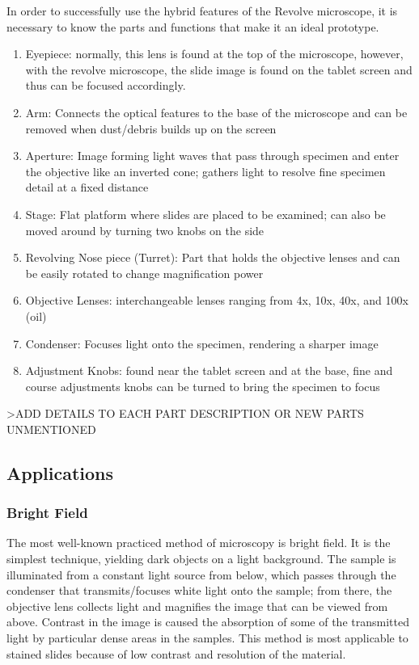 \documentclass{article}
\begin{document}
In order to successfully use the hybrid features of the Revolve microscope, it is necessary to know the parts and functions that make it an ideal prototype. 
  \begin{enumerate}
  \item Eyepiece: normally, this lens is found  at the top of the microscope, however, with the revolve microscope, the slide image is found on the tablet screen and thus can be focused accordingly.
  \item Arm: Connects the optical features to the base of the microscope and can be removed when dust/debris builds up on the screen 
  \item Aperture: Image forming light waves that pass through specimen and enter the objective like an inverted cone; gathers light to resolve fine specimen detail at a fixed distance
  \item Stage: Flat platform where slides are placed to be examined; can also be moved around by turning two knobs on the side 
  \item Revolving Nose piece (Turret): Part that holds the objective lenses and can be easily rotated to change magnification power
  \item Objective Lenses: interchangeable lenses ranging from 4x, 10x, 40x, and 100x (oil)
  \item Condenser: Focuses light onto the specimen, rendering a sharper image
  \item Adjustment Knobs: found near the tablet screen and at the base, fine and course adjustments knobs can be turned to bring the specimen to focus 
\end{enumerate}
 
 >ADD DETAILS TO EACH PART DESCRIPTION OR NEW PARTS UNMENTIONED 

\subsection {Applications}

\subsubsection{Bright Field}
The most well-known practiced method of microscopy is bright field. It is the simplest technique, yielding dark objects on a light background. The sample is illuminated from a constant light source from below, which passes through the condenser that transmits/focuses white light onto the sample; from there, the objective lens collects light and magnifies the image that can be viewed from above. Contrast in the image is caused the absorption of some of the transmitted light by particular dense areas in the samples. This method is most applicable to stained slides because of low contrast and resolution of the material. 
\end{document}
